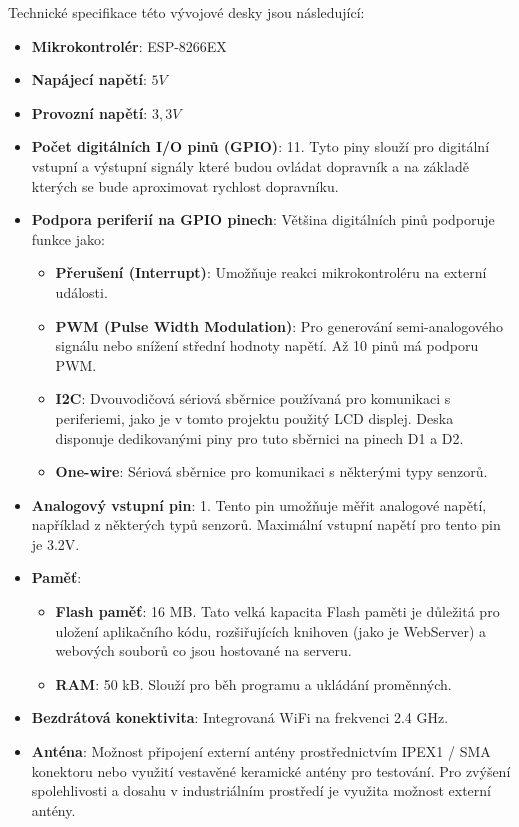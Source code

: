 Technické specifikace této vývojové desky jsou následující: \cite{ESP8266EXDatasheet, D1MiniProDokumentace}
\begin{itemize}
	\item \textbf{Mikrokontrolér}: ESP-8266EX
	\item \textbf{Napájecí napětí}: $5V$
	\item \textbf{Provozní napětí}: $3,3V$
	\item \textbf{Počet digitálních I/O pinů (GPIO)}: 11. Tyto piny slouží pro digitální vstupní a výstupní signály které budou ovládat dopravník a na základě kterých se bude aproximovat rychlost dopravníku.
	\item \textbf{Podpora periferií na GPIO pinech}: Většina digitálních pinů podporuje funkce jako:
	\begin{itemize}
		\item \textbf{Přerušení (Interrupt)}: Umožňuje reakci mikrokontroléru na externí události.
		\item \textbf{PWM (Pulse Width Modulation)}: Pro generování semi-analogového signálu nebo snížení střední hodnoty napětí. Až 10 pinů má podporu PWM.
		\item \textbf{I2C}: Dvouvodičová sériová sběrnice používaná pro komunikaci s periferiemi, jako je v tomto projektu použitý LCD displej. Deska disponuje dedikovanými piny pro tuto sběrnici na pinech D1 a D2.
		\item \textbf{One-wire}: Sériová sběrnice pro komunikaci s některými typy senzorů.
	\end{itemize}
	\item \textbf{Analogový vstupní pin}: 1. Tento pin umožňuje měřit analogové napětí, například z některých typů senzorů. Maximální vstupní napětí pro tento pin je 3.2V.
	\item \textbf{Paměť}:
	\begin{itemize}
		\item \textbf{Flash paměť}: 16 MB. Tato velká kapacita Flash paměti je důležitá pro uložení aplikačního kódu, rozšiřujících knihoven (jako je WebServer) a webových souborů co jsou hostované na serveru.
		\item \textbf{RAM}: 50 kB. Slouží pro běh programu a ukládání proměnných.
	\end{itemize}
	\item \textbf{Bezdrátová konektivita}: Integrovaná WiFi na frekvenci 2.4 GHz.
	\item \textbf{Anténa}: Možnost připojení externí antény prostřednictvím IPEX1 / SMA konektoru nebo využití vestavěné keramické antény pro testování. Pro zvýšení spolehlivosti a dosahu v industriálním prostředí je využita možnost externí antény.

\end{itemize}
